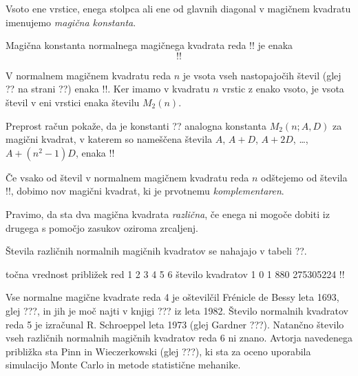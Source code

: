 \documentclass[a4paper,12pt]{article}
\begin{document}
      Vsoto ene vrstice, enega stolpca ali ene od glavnih diagonal
      v magičnem kvadratu imenujemo \emph{magična konstanta}.

   Magična konstanta normalnega magičnega kvadrata reda !!
   je enaka
   \begin{equation}
      !!
   \end{equation}

   V normalnem magičnem kvadratu reda \(n\) je vsota vseh nastopajočih
   števil (glej ?? na strani ??) enaka
   !!. Ker imamo
   v kvadratu \(n\) vrstic z enako vsoto, je vsota števil v eni vrstici
   enaka številu \(M_2(n)\). %

Preprost račun pokaže, da je konstanti ?? analogna konstanta
\(M_2(n;A,D)\) za magični kvadrat, v katerem so nameščena števila
\(A\), \(A+D\), \(A+2D\), \ldots, \(A+(n^2-1)D\), enaka %
!!

      Če vsako od števil v normalnem magičnem kvadratu reda \(n\) odštejemo
      od števila !!, dobimo nov magični kvadrat, ki je prvotnemu
      \emph{komplementaren}.

      Pravimo, da sta dva magična kvadrata \emph{različna}, če enega ni mogoče dobiti
      iz drugega s pomočjo zasukov oziroma zrcaljenj.

Števila različnih normalnih magičnih kvadratov se nahajajo v tabeli ??.

      točna vrednost približek
      red 1 2 3 4 5 6
      število kvadratov 1 0 1 880 275305224 !!

Vse normalne magične kvadrate reda 4 je oštevilčil Frénicle de Bessy
leta 1693, glej ???, in jih je moč najti v knjigi ???
iz leta 1982. Število normalnih kvadratov reda 5 je izračunal
R. Schroeppel leta 1973 (glej Gardner ???).
Natančno število vseh različnih normalnih magičnih kvadratov reda 6 ni znano.
Avtorja navedenega približka sta Pinn in Wieczerkowski (glej ???), ki
sta za oceno uporabila simulacijo Monte Carlo in metode statistične mehanike.


\newpage


\end{document}
